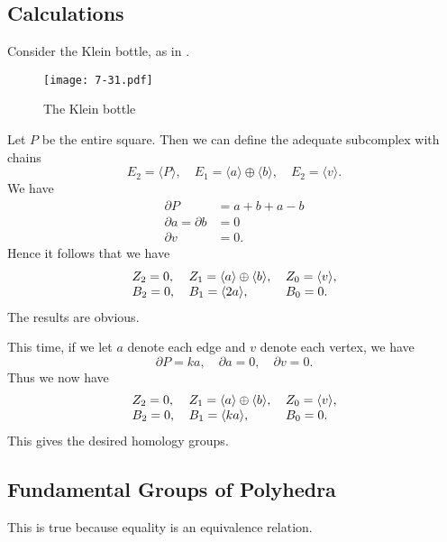 \documentclass[../../solutions.tex]{subfiles}
\begin{document}
\subsection{Calculations}
\begin{exercise} \leavevmode
Consider the Klein bottle, as in .
\begin{figure}[htbp]
\centering
\texttt{[image: 7-31.pdf]}
\caption{The Klein bottle}
\label{fig:7-31}
\end{figure}
Let $P$ be the entire square.
Then we can define the adequate subcomplex with chains
\[E_2=\langle P\rangle,\quad E_1=\langle a\rangle\oplus\langle b\rangle,\quad E_2=\langle v\rangle.\]
We have
\begin{align*}
\partial P&=a+b+a-b\\
\partial a=\partial b&=0\\
\partial v&=0.
\end{align*}
Hence it follows that we have
\[
\begin{tabular}{l l l}
$Z_2=0$, & $Z_1=\langle a\rangle\oplus\langle b\rangle$, & $Z_0=\langle v\rangle$, \\
$B_2=0$, & $B_1=\langle2a\rangle$, & $B_0=0$.
\end{tabular}
\]
The results are obvious.
\end{exercise}

\begin{exercise} \leavevmode
This time, if we let $a$ denote each edge and $v$ denote each vertex, we have
\[\partial P=ka,\quad\partial a=0,\quad\partial v=0.\]
Thus we now have
\[
\begin{tabular}{l l l}
$Z_2=0$, & $Z_1=\langle a\rangle\oplus\langle b\rangle$, & $Z_0=\langle v\rangle$, \\
$B_2=0$, & $B_1=\langle ka\rangle$, & $B_0=0$.
\end{tabular}
\]
This gives the desired homology groups.
\end{exercise}

\subsection{Fundamental Groups of Polyhedra}
\begin{exercise} \leavevmode
This is true because equality is an equivalence relation.
\end{exercise}
\end{document}
